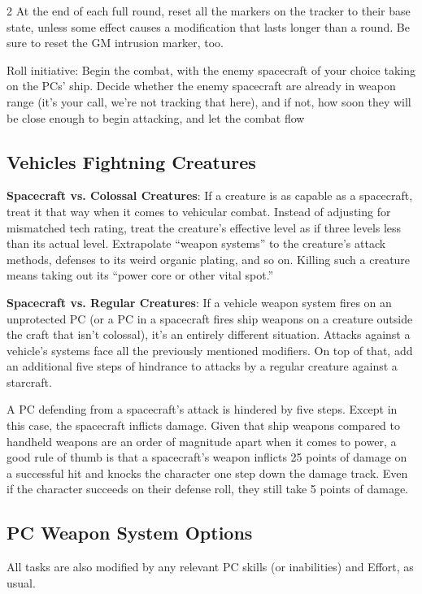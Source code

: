 \begin{multicols}{2}
At the end of each full round, reset all the markers on the tracker to their base state, unless some effect causes a modification that lasts longer than a round. Be sure to reset the GM intrusion marker, too.

Roll initiative: Begin the combat, with the enemy spacecraft of your choice taking on the PCs’ ship. Decide whether the enemy spacecraft are already in weapon range (it’s your call, we’re not tracking that here), and if not, how soon they will be close enough to begin attacking, and let the combat flow

\subsection{Vehicles Fightning Creatures}

\textbf{Spacecraft vs. Colossal Creatures}: If a creature is as capable as a spacecraft, treat it that way when it comes to vehicular combat. Instead of adjusting for mismatched tech rating, treat the creature’s effective level as if three levels less than its actual level. Extrapolate “weapon systems” to the creature’s attack methods, defenses to its weird organic plating, and so on. Killing such a creature means taking out its “power core or other vital spot.”

\textbf{Spacecraft vs. Regular Creatures}: If a vehicle weapon system fires on an unprotected PC (or a PC in a spacecraft fires ship weapons on a creature outside the craft that isn’t colossal), it’s an entirely different situation. Attacks against a vehicle’s systems face all the previously mentioned modifiers. On top of that, add an additional five steps of hindrance to attacks by a regular creature against a starcraft.

A PC defending from a spacecraft’s attack is hindered by five steps. Except in this case, the spacecraft inflicts damage. Given that ship weapons compared to handheld weapons are an order of magnitude apart when it comes to power, a good rule of thumb is that a spacecraft’s weapon inflicts 25 points of damage on a successful hit and knocks the character one step down the damage track. Even if the character succeeds on their defense roll, they still take 5 points of damage.

\subsection{PC Weapon System Options}

All tasks are also modified by any relevant PC skills (or inabilities) and Effort, as usual. 

\end{multicols}

